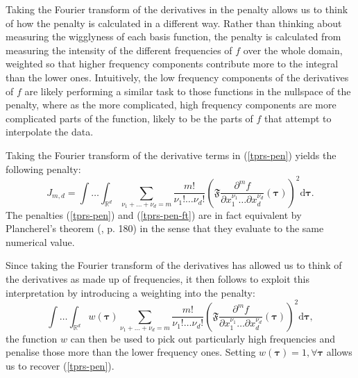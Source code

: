 Taking the Fourier transform of the derivatives in the penalty allows us to think of how the penalty is calculated in a different way. Rather than thinking about measuring the wigglyness of each basis function, the penalty is calculated from measuring the intensity of the different frequencies of $f$ over the whole domain, weighted so that higher frequency components contribute more to the integral than the lower ones. Intuitively, the low frequency components of the derivatives of $f$ are likely performing a similar task to those functions in the nullspace of the penalty, where as the more complicated, high frequency components are more complicated parts of the function, likely to be the parts of $f$ that attempt to interpolate the data.

Taking the Fourier transform of the derivative terms in (\ref{tprs-pen}) yields the following penalty:
\begin{equation}
J_{m,d} = \int \ldots \int_{\mathbb{R}^d} \sum_{\nu_1 + \dots + \nu_d=m} \frac{m!}{\nu_1! \dots \nu_d!} \left ( \mathfrak{F} \frac{\partial^m f}{\partial x_1^{\nu_1} \ldots  \partial x_d^{\nu_d}} \left (  \boldsymbol{\tau}\right ) \right )^2 \text{d} \boldsymbol{\tau}.
\label{tprs-pen-ft}
\end{equation}
The penalties (\ref{tprs-pen}) and (\ref{tprs-pen-ft}) are in fact equivalent by Plancherel's theorem (\cite{vretblad}, p. 180) in the sense that they evaluate to the same numerical value.

Since taking the Fourier transform of the derivatives has allowed us to think of the derivatives as made up of frequencies, it then follows to exploit this interpretation by introducing a weighting into the penalty: 
\begin{equation}
\int \ldots \int_{\mathbb{R}^d} w(\boldsymbol{\tau}) \sum_{\nu_1 + \dots + \nu_d=m} \frac{m!}{\nu_1! \dots \nu_d!} \left ( \mathfrak{F} \frac{\partial^m f}{\partial x_1^{\nu_1} \ldots  \partial x_d^{\nu_d}} \left (\boldsymbol{\tau} \right ) \right )^2 \text{d} \boldsymbol{\tau},
\label{duchon-penalty-general}
\end{equation}
the function $w$ can then be used to pick out particularly high frequencies and penalise those more than the lower frequency ones. Setting $w(\boldsymbol{\tau})=1, \forall \boldsymbol{\tau}$ allows us to recover (\ref{tprs-pen}).

